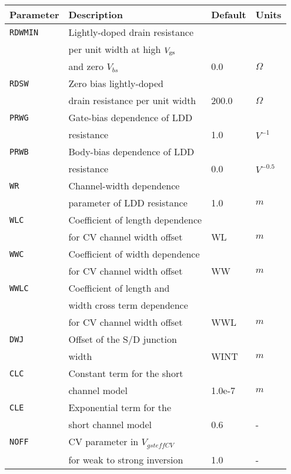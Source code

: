\documentclass{article}
\begin{document}
\newpage
\begin{table}[H]
\begin{tabular}{|l| l| l| l|}
\hline
\textbf{Parameter} & \textbf{Description} & \textbf{Default} & \textbf{Units} \\
\hline
\texttt{RDWMIN} & Lightly-doped drain resistance & & \\
                & per unit width at high $V_{\rm{gs}}$ & & \\
                & and zero $V_{bs}$ & 0.0 & $\Omega$\\
\texttt{RDSW} & Zero bias lightly-doped & & \\
              & drain resistance per unit width & 200.0 & $\Omega$\\
\texttt{PRWG} & Gate-bias dependence of LDD & & \\
              & resistance & 1.0 & $V^{-1}$\\
\texttt{PRWB} & Body-bias dependence of LDD & & \\
              & resistance & 0.0 & $V^{-0.5}$\\
\texttt{WR} & Channel-width dependence & & \\
            &  parameter of LDD resistance & 1.0 & $m$\\
\texttt{WLC} & Coefficient of length dependence & & \\
             & for CV channel width offset & WL & $m$\\
\texttt{WWC} & Coefficient of width dependence & & \\
             & for CV channel width offset & WW & $m$\\
\texttt{WWLC} & Coefficient of length and & & \\
              & width cross term dependence & & \\
              & for CV channel width offset & WWL & $m$\\
\texttt{DWJ} & Offset of the S/D junction & & \\
             & width & WINT & $m$\\
\texttt{CLC} & Constant term for the short & & \\
             & channel model & 1.0e-7 & $m$\\
\texttt{CLE} & Exponential term for the & & \\
             & short channel model & 0.6 & -\\
\texttt{NOFF} & CV parameter in $V_{gsteffCV}$ & & \\
              & for weak to strong inversion & 1.0 & -\\

\end{tabular}
\end{table}
\end{document}
